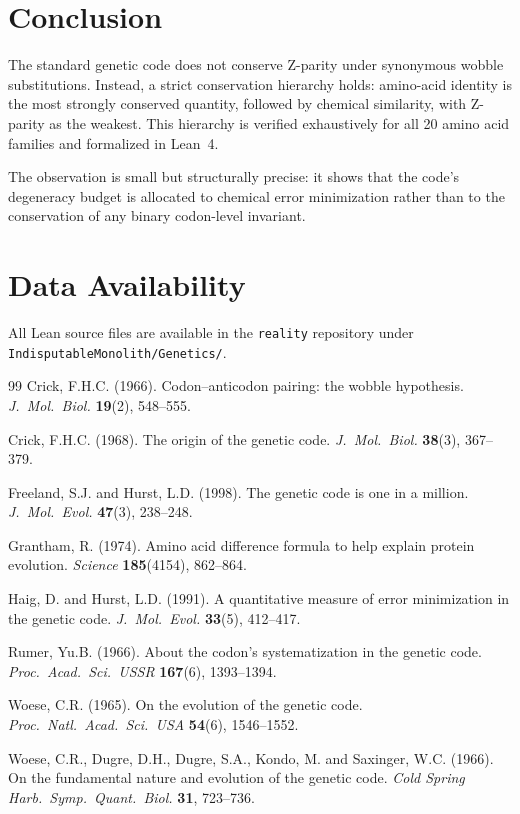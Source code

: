 \documentclass[11pt,twocolumn]{article}
\begin{document}
\section{Conclusion}

The standard genetic code does not conserve Z-parity under synonymous
wobble substitutions. Instead, a strict conservation hierarchy holds:
amino-acid identity is the most strongly conserved quantity, followed by
chemical similarity, with Z-parity as the weakest. This hierarchy is
verified exhaustively for all 20 amino acid families and formalized in
Lean~4.

The observation is small but structurally precise: it shows that the
code's degeneracy budget is allocated to chemical error minimization
rather than to the conservation of any binary codon-level invariant.

\section*{Data Availability}

All Lean source files are available in the \texttt{reality} repository
under \texttt{IndisputableMonolith/Genetics/}.

\begin{thebibliography}{99}
Crick, F.H.C. (1966). Codon--anticodon pairing: the wobble hypothesis.
\textit{J.~Mol.~Biol.} \textbf{19}(2), 548--555.

Crick, F.H.C. (1968). The origin of the genetic code.
\textit{J.~Mol.~Biol.} \textbf{38}(3), 367--379.

Freeland, S.J. and Hurst, L.D. (1998). The genetic code is one in a
million. \textit{J.~Mol.~Evol.} \textbf{47}(3), 238--248.

Grantham, R. (1974). Amino acid difference formula to help explain protein
evolution. \textit{Science} \textbf{185}(4154), 862--864.

Haig, D. and Hurst, L.D. (1991). A quantitative measure of error
minimization in the genetic code. \textit{J.~Mol.~Evol.} \textbf{33}(5),
412--417.

Rumer, Yu.B. (1966). About the codon's systematization in the genetic
code. \textit{Proc.~Acad.~Sci.~USSR} \textbf{167}(6), 1393--1394.

Woese, C.R. (1965). On the evolution of the genetic code.
\textit{Proc.~Natl.~Acad.~Sci.~USA} \textbf{54}(6), 1546--1552.

Woese, C.R., Dugre, D.H., Dugre, S.A., Kondo, M. and Saxinger, W.C.
(1966). On the fundamental nature and evolution of the genetic code.
\textit{Cold Spring Harb.~Symp.~Quant.~Biol.} \textbf{31}, 723--736.
\end{thebibliography}
\end{document}
